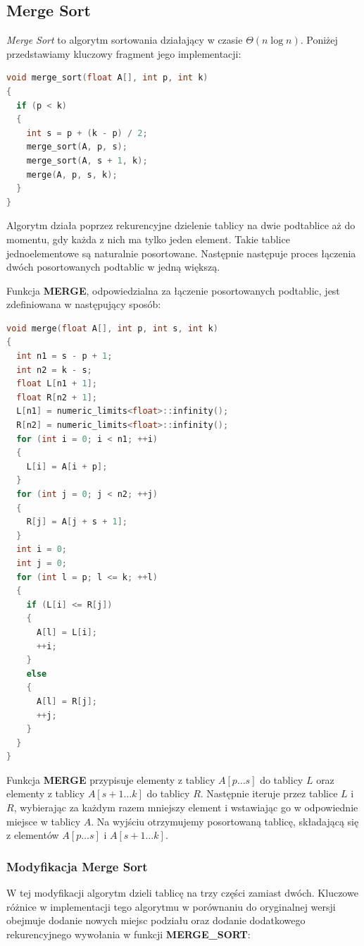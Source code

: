 \documentclass{article}
\begin{document}
\subsection{Merge Sort}
\textit{Merge Sort} to algorytm sortowania działający w czasie $\Theta(n \log n)$. Poniżej przedstawiamy kluczowy fragment jego implementacji:
\begin{lstlisting}[style=mystyle, language=C++, caption={Implementacja \texttt{Merge Sort}}, label={lst:mergesort}]
void merge_sort(float A[], int p, int k)
{
  if (p < k)
  {
    int s = p + (k - p) / 2;
    merge_sort(A, p, s);
    merge_sort(A, s + 1, k);
    merge(A, p, s, k);
  }
}
\end{lstlisting}
Algorytm działa poprzez rekurencyjne dzielenie tablicy na dwie podtablice aż do momentu, gdy każda z nich ma tylko jeden element. Takie tablice jednoelementowe są naturalnie posortowane. Następnie następuje proces łączenia dwóch posortowanych podtablic w jedną większą.

Funkcja \textbf{MERGE}, odpowiedzialna za łączenie posortowanych podtablic, jest zdefiniowana w następujący sposób:

\newpage
 
\begin{lstlisting}[style=mystyle, language=C++, caption={Implementacja \texttt{Merge}}, label={lst:merge}]
void merge(float A[], int p, int s, int k)
{
  int n1 = s - p + 1;
  int n2 = k - s;
  float L[n1 + 1];
  float R[n2 + 1];
  L[n1] = numeric_limits<float>::infinity();
  R[n2] = numeric_limits<float>::infinity();
  for (int i = 0; i < n1; ++i)
  {
    L[i] = A[i + p];
  }
  for (int j = 0; j < n2; ++j)
  {
    R[j] = A[j + s + 1];
  }
  int i = 0;
  int j = 0;
  for (int l = p; l <= k; ++l)
  {
    if (L[i] <= R[j])
    {
      A[l] = L[i];
      ++i;
    }
    else
    {
      A[l] = R[j];
      ++j;
    }
  }
} 
\end{lstlisting}
Funkcja \textbf{MERGE} przypisuje elementy z tablicy $A[p \ldots s]$ do tablicy $L$ oraz elementy z tablicy $A[s+1 \ldots k]$ do tablicy $R$. Następnie iteruje przez tablice $L$ i $R$, wybierając za każdym razem mniejszy element i wstawiając go w odpowiednie miejsce w tablicy $A$. Na wyjściu otrzymujemy posortowaną tablicę, składającą się z elementów $A[p \ldots s]$ i $A[s+1 \ldots k]$.
\subsubsection{Modyfikacja Merge Sort}
W tej modyfikacji algorytm dzieli tablicę na trzy części zamiast dwóch. Kluczowe różnice w implementacji tego algorytmu w porównaniu do oryginalnej wersji obejmuje dodanie nowych miejsc podziału oraz dodanie dodatkowego rekurencyjnego wywołania w funkcji \textbf{MERGE\_SORT}:
\end{document}
